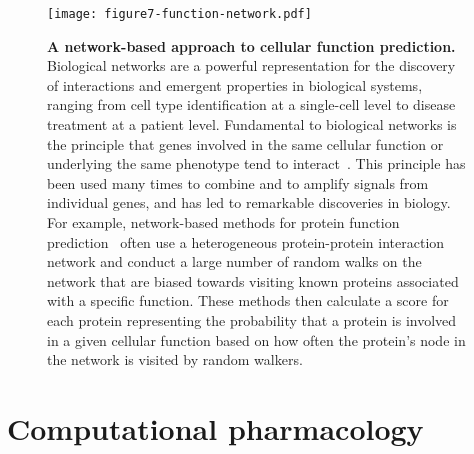 \documentclass[5p]{elsarticle}
\begin{document}
\begin{figure}[t]
\centering
\texttt{[image: figure7-function-network.pdf]}
\caption{\textbf{A network-based approach to cellular function prediction.} Biological networks are a powerful representation for the discovery of interactions and emergent properties in biological systems, ranging from cell type identification at a single-cell level to disease treatment at a patient level. Fundamental to biological networks is the principle that genes involved in the same cellular function or underlying the same phenotype tend to interact~\cite{Cowen2017network}. This principle has been used many times to combine and to amplify signals from individual genes, and has led to remarkable discoveries in biology. For example, network-based methods for protein function prediction~\cite{Li2010genome,Blatti2016characterizing,Zitnik2017ohmnet,Liu2017inferring} often use a heterogeneous protein-protein interaction network and conduct a large number of random walks on the network that are biased towards visiting known proteins associated with a specific function. These methods then calculate a score for each protein representing the probability that a protein is involved in a given cellular function based on how often the protein's node in the network is visited by random walkers.}
\label{fig:function-ppi-prediction}
\end{figure}

\section{Computational pharmacology}\label{sec:drug}
\end{document}
